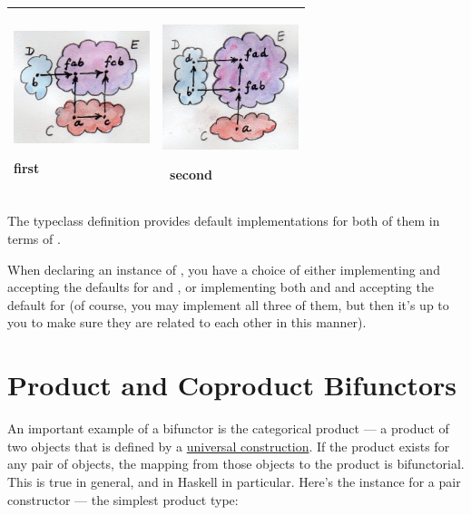 \begin{longtable}[]{@{}ll@{}}
\toprule
\begin{minipage}[t]{0.48\columnwidth}\raggedright\strut
\includegraphics[width=1.56250in]{images/first.jpg}

first\strut
\end{minipage} & \begin{minipage}[t]{0.48\columnwidth}\raggedright\strut
\hypertarget{attachment_4072}{}
\includegraphics[width=1.56250in]{images/second.jpg}

~second\strut
\end{minipage}\tabularnewline
\bottomrule
\end{longtable}

\noindent
The typeclass definition provides default implementations for both of
them in terms of .

When declaring an instance of , you have a choice of
either implementing  and accepting the defaults for
 and , or implementing both 
and  and accepting the default for  (of
course, you may implement all three of them, but then it's up to you to
make sure they are related to each other in this manner).

\section{Product and Coproduct Bifunctors}

An important example of a bifunctor is the categorical product --- a
product of two objects that is defined by a \hyperref[products-and-coproducts]{universal
construction}. If the product exists for any pair of objects, the
mapping from those objects to the product is bifunctorial. This is true
in general, and in Haskell in particular. Here's the 
instance for a pair constructor --- the simplest product type:

